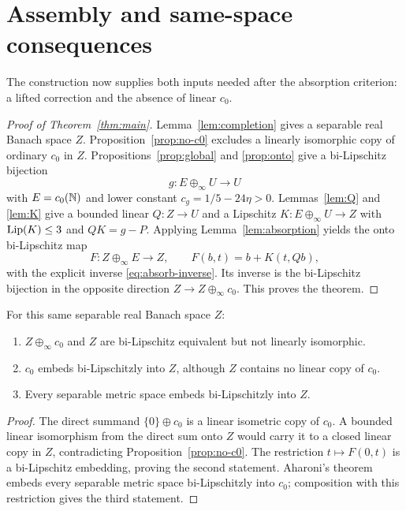 \section{Assembly and same-space consequences}\label{sec:assembly}

The construction now supplies both inputs needed after the absorption
criterion: a lifted correction and the absence of linear \(c_0\).

\begin{proof}[Proof of Theorem~\ref{thm:main}]
Lemma~\ref{lem:completion} gives a separable real Banach space \(Z\).
Proposition~\ref{prop:no-c0} excludes a linearly isomorphic copy of
ordinary \(c_0\) in \(Z\). Propositions~\ref{prop:global} and
\ref{prop:onto} give a bi-Lipschitz bijection
\[
                      g:E\oplus_\infty U\longrightarrow U
\]
with \(E=c_0(\mathbb N)\) and lower constant
\(c_g=1/5-24\eta>0\). Lemmas~\ref{lem:Q} and \ref{lem:K} give a
bounded linear \(Q:Z\to U\) and a Lipschitz \(K:E\oplus_\infty U\to Z\)
with \(\operatorname{Lip}(K)\leq3\) and \(QK=g-P\). Applying
Lemma~\ref{lem:absorption} yields the onto bi-Lipschitz map
\[
             F:Z\oplus_\infty E\to Z,\qquad
             F(b,t)=b+K(t,Qb),
\]
with the explicit inverse \eqref{eq:absorb-inverse}. Its inverse is the
bi-Lipschitz bijection in the opposite direction
\(Z\to Z\oplus_\infty c_0\). This proves the theorem.
\end{proof}

\begin{samepage}
\begin{corollary}\label{cor:same-space}
For this same separable real Banach space \(Z\):
\begin{enumerate}
\item \(Z\oplus_\infty c_0\) and \(Z\) are bi-Lipschitz equivalent
but not linearly isomorphic.
\item \(c_0\) embeds bi-Lipschitzly into \(Z\), although \(Z\)
contains no linear copy of \(c_0\).
\item Every separable metric space embeds bi-Lipschitzly into \(Z\).
\end{enumerate}
\end{corollary}
\end{samepage}

\begin{proof}
The direct summand \(\{0\}\oplus c_0\) is a linear isometric copy of
\(c_0\). A bounded linear isomorphism from the direct sum onto \(Z\)
would carry it to a closed linear copy in \(Z\), contradicting
Proposition~\ref{prop:no-c0}. The restriction \(t\mapsto F(0,t)\)
is a bi-Lipschitz embedding, proving the second statement.
Aharoni's theorem \cite{Aharoni74} embeds every separable metric space
bi-Lipschitzly into \(c_0\); composition with this restriction gives
the third statement.
\end{proof}
